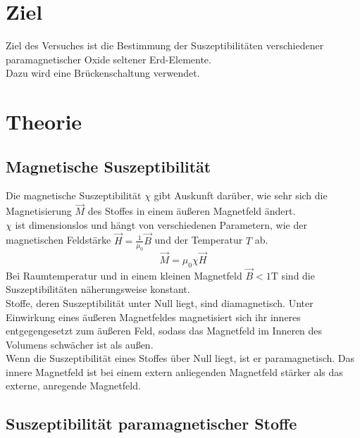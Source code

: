 \section{Ziel}
\label{sec:Ziel}

Ziel des Versuches ist die Bestimmung der Suszeptibilitäten
verschiedener paramagnetischer Oxide seltener Erd-Elemente.\\
Dazu wird eine Brückenschaltung verwendet.\\ 


\section{Theorie}
\label{sec:Theorie}

\subsection{Magnetische Suszeptibilität}

Die magnetische Suszeptibilität $\chi$ gibt Auskunft darüber, wie sehr sich 
die Magnetisierung $\vec{M}$ des Stoffes in einem äußeren Magnetfeld ändert.\\
$\chi$ ist dimensionslos und hängt von verschiedenen Parametern, wie der magnetischen Feldstärke
$\vec{H} = \frac{1}{\mu_0} \vec{B}$ und der Temperatur $T$ ab. \\
\begin{equation*}
    \vec{M} = \mu_0 \chi \vec{H}
\end{equation*}
Bei Raumtemperatur und in einem kleinen Magnetfeld $\vec{B} < 1 \mathrm{T}$ sind die Suszeptibilitäten
näherungsweise konstant. \\
Stoffe, deren Suszeptibilität unter Null liegt, sind diamagnetisch. Unter Einwirkung eines äußeren Magnetfeldes
magnetisiert sich ihr inneres entgegengesetzt zum äußeren Feld, sodass 
das Magnetfeld im Inneren des Volumens schwächer ist als außen. \\
Wenn die Suszeptibilität eines Stoffes über Null liegt, ist er paramagnetisch. 
Das innere Magnetfeld ist bei einem extern anliegenden Magnetfeld stärker als das externe, anregende Magnetfeld.\\



\subsection{Suszeptibilität paramagnetischer Stoffe}

